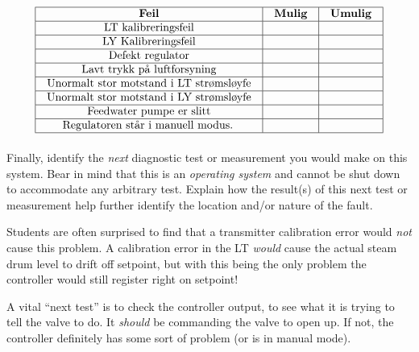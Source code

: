 
$$\vbox{\offinterlineskip
\halign{\strut
\vrule \quad\hfil # \ \hfil & 
\vrule \quad\hfil # \ \hfil & 
\vrule \quad\hfil # \ \hfil \vrule \cr
\noalign{\hrule}
%
{\bf Feil} & {\bf Mulig} & {\bf Umulig} \cr
%
\noalign{\hrule}
%
LT kalibreringsfeil &  &  \cr
%
\noalign{\hrule}
%
LY Kalibreringsfeil &  &  \cr
%
\noalign{\hrule}
%
Defekt regulator &  &  \cr
%
\noalign{\hrule}
%
Lavt trykk på luftforsyning &  &  \cr
%
\noalign{\hrule}
%
Unormalt stor motstand i LT strømsløyfe &  &  \cr
%
\noalign{\hrule}
%
Unormalt stor motstand i LY strømsløyfe &  &  \cr
%
\noalign{\hrule}
%
Feedwater pumpe er slitt &  &  \cr
%
\noalign{\hrule}
%
Regulatoren står i manuell modus. &  &  \cr
%
\noalign{\hrule}
} %
}$$ %

Finally, identify the {\it next} diagnostic test or measurement you would make on this system.  Bear in mind that this is an {\it operating system} and cannot be shut down to accommodate any arbitrary test.  Explain how the result(s) of this next test or measurement help further identify the location and/or nature of the fault.







Students are often surprised to find that a transmitter calibration error would {\it not} cause this problem.  A calibration error in the LT {\it would} cause the actual steam drum level to drift off setpoint, but with this being the only problem the controller would still register right on setpoint!

\vskip 10pt

A vital ``next test'' is to check the controller output, to see what it is trying to tell the valve to do.  It {\it should} be commanding the valve to open up.  If not, the controller definitely has some sort of problem (or is in manual mode).








